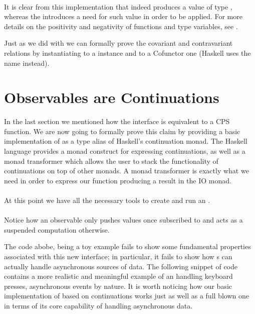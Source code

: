 \\

It is clear from this implementation that  indeed produces a value of type , whereas the  introduces a need for such value in order to be applied. For more details on the positivity and negativity of functions and type variables, see \cite{pos-neg}\cite{pos-neg2}.

Just as we did with  we can formally prove the covariant and contravariant relations by instantiating  to a  instance and  to a Cofunctor one (Haskell uses the name  instead).\\


\section{Observables are Continuations}
\label{obscont}

In the last section we mentioned how the  interface is equivalent to a CPS function. We are now going to formally prove this claim by providing a basic implementation of  as a type alias of Haskell's continuation monad. The Haskell language provides a monad construct for expressing continuations, as well as a monad transformer which allows the user to stack the functionality of continuations on top of other monads. A monad transformer is exactly what we need in order to express our  function producing a result in the IO monad.\\

\\

At this point we have all the necessary tools to create and run an .\\

\\

Notice how an observable only pushes values once subscribed to and acts as a suspended computation otherwise. 

The code abobe, being a toy example fails to show some fundamental properties associated with this new interface; in particular, it fails to show how s can actually handle asynchronous sources of data. The following snippet of code contains a more realistic and meaningful example of an  handling keyboard presses, asynchronous events by nature. It is worth noticing how our basic implementation of  based on continuations works just as well as a full blown one in terms of its core capability of handling asynchronous data.\\ 

